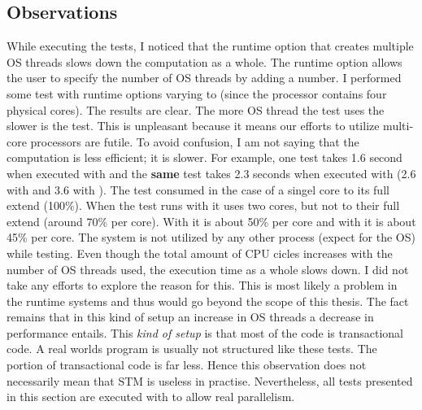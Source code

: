 \subsection{Observations}
While executing the tests, I noticed that the runtime option  that creates multiple OS threads slows down the 
computation as a whole. The runtime option  allows the user to specify the number of OS threads by adding a 
number. I performed some test with runtime options varying  to  (since the processor contains four 
physical cores). The results are clear. The more OS thread the test uses the slower is the test. This is unpleasant 
because it means our efforts to utilize multi-core processors are futile. To avoid confusion, I am not saying that 
the computation is less efficient; it is slower. For example, one test takes 1.6 second when executed with 
and the \textbf{same} test takes 2.3 seconds when executed with  (2.6 with  and 3.6 with ).
The test consumed in the case of  a singel core to its full extend (100\%). When the test runs with 
it uses two cores, but not to their full extend (around 70\% per core). With  it is about 50\% per core and 
with  it is about 45\% per core. The system is not utilized by any other process (expect for the OS) while
testing. Even though the total amount of CPU cicles increases with the number of OS threads used, the execution time 
as a whole slows down. I did not take any efforts to explore the reason for this. This is most likely a problem 
in the runtime systems and thus would go beyond the scope of this thesis. The fact remains that in this kind of
setup an increase in OS threads a decrease in performance entails. This \textit{kind of setup} is that most of 
the code is transactional code. A real worlds program is usually not structured like these tests. The portion
of transactional code is far less. Hence this observation does not necessarily mean that STM is useless in 
practise. Nevertheless, all tests presented in this section are executed with  to allow real parallelism. 

